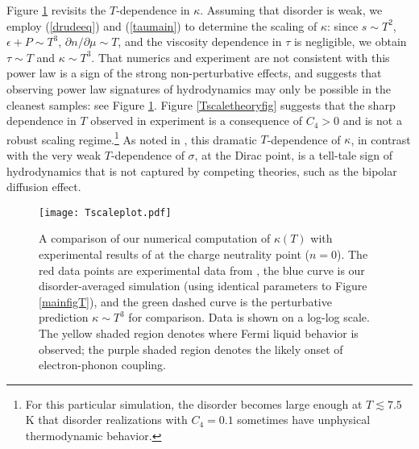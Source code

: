\documentclass[10pt, oneside]{book}
\begin{document}
\begin{doublespace}
Figure \ref{Tscalefig} revisits the $T$-dependence in $\kappa$.  Assuming that disorder is weak, we employ (\ref{drudeeq}) and (\ref{taumain}) to determine the scaling of $\kappa$:  since  $s\sim T^2$, $\epsilon+P\sim T^3$, $\partial n/\partial \mu \sim T$, and the viscosity dependence in $\tau$ is negligible, we obtain $\tau \sim T$ and $\kappa \sim T^3$.   That numerics and experiment are not consistent with this power law is a sign of the strong non-perturbative effects, and suggests that observing  power law signatures of hydrodynamics may only be possible in the cleanest samples:
see Figure \ref{Tscalefig}.    Figure \ref{Tscaletheoryfig} suggests that the sharp dependence in $T$ observed in experiment is a consequence of $C_4>0$ and is not a robust scaling regime.\footnote{For this particular simulation, the disorder becomes large enough at $T\lesssim 7.5$ K that disorder realizations with $C_4=0.1$ sometimes have unphysical thermodynamic behavior.}  As noted in \cite{Crossno1058}, this dramatic $T$-dependence of $\kappa$, in contrast with the very weak $T$-dependence of $\sigma$, at the Dirac point, is a tell-tale sign of hydrodynamics that is not captured by competing theories, such as the bipolar diffusion effect.
 


\begin{figure}[t]
\centering
\texttt{[image: Tscaleplot.pdf]}
\caption{A comparison of our numerical computation of $\kappa(T)$ with experimental results of \cite{Crossno1058}  at the charge neutrality point ($n=0$).   The red data points are experimental data from \cite{Crossno1058}, the blue curve is our disorder-averaged simulation (using identical parameters to Figure \ref{mainfigT}), and the green dashed curve is the perturbative prediction $\kappa \sim T^3$ for comparison.  Data is shown on a log-log scale.  The yellow shaded region denotes where Fermi liquid behavior is observed; the purple shaded region denotes the likely onset of electron-phonon coupling.   }
\label{Tscalefig}
\end{figure}


\end{doublespace}
\end{document}
